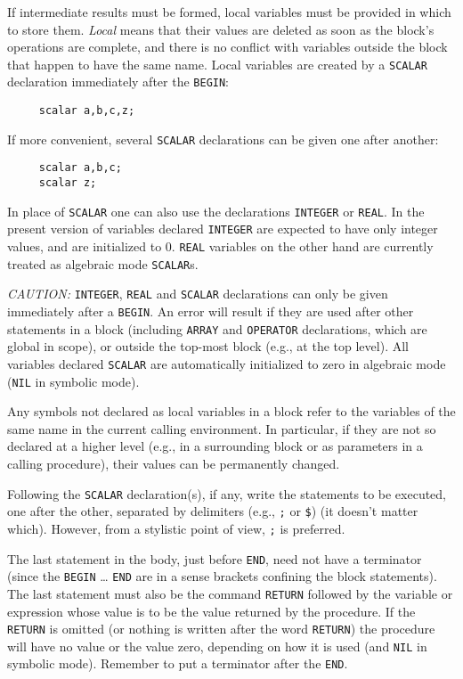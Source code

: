 If intermediate results must be formed, local variables must be provided
in which to store them. \emph{Local} means that their values are deleted as
soon as the block's operations are complete, and there is no conflict with
variables outside the block that happen to have the same name.  Local
variables are created by a \texttt{SCALAR} declaration
immediately after the \texttt{BEGIN}:
\begin{verbatim}
     scalar a,b,c,z;
\end{verbatim}
If more convenient, several \texttt{SCALAR} declarations can be given one after
another:
\begin{verbatim}
     scalar a,b,c;
     scalar z;
\end{verbatim}
In place of \texttt{SCALAR} one can also use the declarations
\texttt{INTEGER} or \texttt{REAL}.
In the present version of {\REDUCE} variables declared \texttt{INTEGER}
are expected to have only integer values, and are initialized to 0.
\texttt{REAL} variables on the other hand are currently treated as algebraic
mode \texttt{SCALAR}s.

\textit{CAUTION:} \texttt{INTEGER}, \texttt{REAL} and \texttt{SCALAR} declarations can
only be given immediately after a \texttt{BEGIN}.  An error will result if
they are used after other statements in a block (including \texttt{ARRAY} and
\texttt{OPERATOR} declarations, which are global in scope), or outside the
top-most block (e.g., at the top level).  All variables declared 
\texttt{SCALAR} are automatically initialized to zero in algebraic mode
(\texttt{NIL} in symbolic mode).

Any symbols not declared as local variables in a block refer to the
variables of the same name in the current calling environment. In
particular, if they are not so declared at a higher level (e.g., in a
surrounding block or as parameters in a calling procedure), their values can
be permanently changed.

Following the \texttt{SCALAR} declaration(s), if any, write the
statements to be executed, one after the other, separated by delimiters
(e.g., \texttt{;} or \texttt{\$}) (it doesn't matter which).  However, from a
stylistic point of view, \texttt{;} is preferred.

The last statement in the body, just before \texttt{END}, need not have a
terminator (since the \texttt{BEGIN} \ldots{} \texttt{END} are in a sense brackets
confining the block statements).  The last statement must also be the
command \texttt{RETURN} followed by the variable or
expression whose value is to be the value returned by the procedure.  If
the \texttt{RETURN} is omitted (or nothing is written after the word
\texttt{RETURN}) the procedure will have no value or the value zero, depending
on how it is used (and \texttt{NIL} in symbolic mode).  Remember to put a
terminator after the \texttt{END}.

